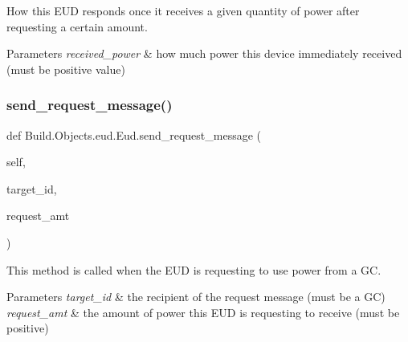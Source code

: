 How this E\+UD responds once it receives a given quantity of power after requesting a certain amount. 


\begin{DoxyParams}{Parameters}
{\em received\+\_\+power} & how much power this device immediately received (must be positive value) \\
\hline
\end{DoxyParams}
\mbox{\label{class_build_1_1_objects_1_1eud_1_1_eud_a13b6abd062b9b88597dc83c9c7813fdc}} 
\subsubsection{\texorpdfstring{send\+\_\+request\+\_\+message()}{send\_request\_message()}}
{\footnotesize\ttfamily def Build.\+Objects.\+eud.\+Eud.\+send\+\_\+request\+\_\+message (\begin{DoxyParamCaption}\item[{}]{self,  }\item[{}]{target\+\_\+id,  }\item[{}]{request\+\_\+amt }\end{DoxyParamCaption})}



This method is called when the E\+UD is requesting to use power from a GC. 


\begin{DoxyParams}{Parameters}
{\em target\+\_\+id} & the recipient of the request message (must be a GC) \\
\hline
{\em request\+\_\+amt} & the amount of power this E\+UD is requesting to receive (must be positive) \\
\hline
\end{DoxyParams}
\mbox{\label{class_build_1_1_objects_1_1eud_1_1_eud_a6f7982b4d798f0a26222ec4a96366b9a}} 
